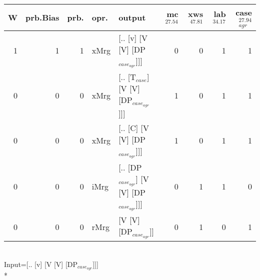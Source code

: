 \begin{tabularx}{\linewidth}{rrrlXrrrr}
\hline
   W &   prb.Bias &   prb. & opr.   & output                                   &   mc$^{27.54}$ &   xws$^{47.81}$ &   lab$^{34.17}$ &   case$_{agr}^{27.94}$ \\
\hline
   1 &       1 &   1 & xMrg & [.. [v] [V [V] [DP$_{case_{agr}}$]]]           &            0 &             0 &             1 &                  1 \\
   0 &       0 &   0 & xMrg & [.. [T$_{case}$] [V [V] [DP$_{case_{agr}}$]]]      &            1 &             0 &             1 &                  1 \\
   0 &       0 &   0 & xMrg & [.. [C] [V [V] [DP$_{case_{agr}}$]]]           &            1 &             0 &             1 &                  1 \\
   0 &       0 &   0 & iMrg & [.. [DP$_{case_{agr}}$] [V [V] [DP$_{case_{agr}}$]]] &            0 &             1 &             1 &                  0 \\
   0 &       0 &   0 & rMrg & [V [V] [DP$_{case_{agr}}$]]                    &            0 &             1 &             0 &                  1 \\
\hline
\end{tabularx}\endgroup\\
\begingroup\scriptsize Input=[.. [v] [V [V] [DP$_{case_{agr}}$]]]\\*
